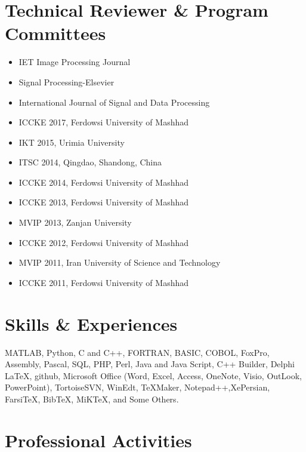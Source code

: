 \documentclass[10pt,a4paper]{moderncv}
\begin{document}
\section{Technical Reviewer \& Program Committees}

\begin{itemize}
\item IET Image Processing Journal
\item Signal Processing-Elsevier
\item International Journal of Signal and Data Processing
\item ICCKE 2017, Ferdowsi University of Mashhad
\item IKT 2015, Urimia University
\item ITSC 2014, Qingdao, Shandong, China
\item ICCKE 2014, Ferdowsi University of Mashhad
\item ICCKE 2013, Ferdowsi University of Mashhad
\item MVIP 2013, Zanjan University
\item ICCKE 2012, Ferdowsi University of Mashhad
\item MVIP 2011, Iran University of Science and Technology
\item ICCKE 2011, Ferdowsi University of Mashhad
\end{itemize}

\newpage
\section{Skills \& Experiences}
{MATLAB, Python, C and C++,  FORTRAN, BASIC, COBOL, FoxPro,  Assembly, Pascal, SQL, PHP, Perl, Java and Java Script, C++ Builder, Delphi} {}{}{}{}
{ \LaTeX, github, Microsoft Office (Word, Excel, Access, OneNote, Visio,
 OutLook, PowerPoint), TortoiseSVN, WinEdt, TeXMaker, Notepad++,XePersian,
 Farsi\TeX, Bib\TeX, MiKTeX, and Some Others.} {}{}{}{} %

\section{Professional Activities}
\end{document}
